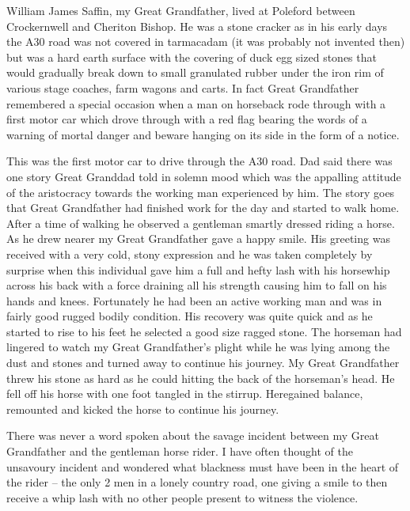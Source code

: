 
William James Saffin, my Great Grandfather, lived at Poleford between
Crockernwell and Cheriton Bishop.  He was a stone cracker as in his early days
the A30 road was not covered in tarmacadam (it was probably not invented then)
but was a hard earth surface with the covering of duck egg sized stones that
would gradually break down to small granulated rubber under the iron rim of
various stage coaches, farm wagons and carts.  In fact Great Grandfather
remembered a special occasion when a man on horseback rode through with a first
motor car which drove through with a red flag bearing the words of a warning of
mortal danger and beware hanging on its side in the form of a notice.

This was the first motor car to drive through the A30 road.  Dad said there was
one story Great Granddad told in solemn mood which was the appalling attitude
of the aristocracy towards the working man experienced by him.   The story goes
that Great Grandfather had finished work for the day and started to walk home.
After a time of walking he observed a gentleman smartly dressed riding a horse.
As he drew nearer my Great Grandfather gave a happy smile.  His greeting was
received with a very cold, stony expression and he was taken completely by
surprise when this individual gave him a full and hefty lash with his horsewhip
across his back with a force draining all his strength causing him to fall on
his hands and knees.  Fortunately he had been an active working man and was in
fairly good rugged bodily condition.  His recovery was quite quick and as he
started to rise to his feet he selected a good size ragged stone.  The horseman
had lingered to watch my Great Grandfather's plight while he was lying among
the dust and stones and turned away to continue his journey.  My Great
Grandfather threw his stone as hard as he could hitting the back of the
horseman's head.  He fell off his horse with one foot tangled in the stirrup.
Heregained balance, remounted and kicked the horse to continue his journey.

There was never a word spoken about the savage incident between my Great
Grandfather and the gentleman horse rider.  I have often thought of the
unsavoury incident and wondered what blackness must have been in the heart of
the rider – the only 2 men in a lonely country road, one giving a smile to then
receive a whip lash with no other people present to witness the violence.

